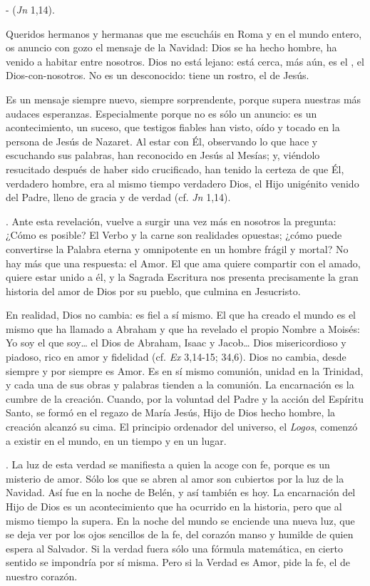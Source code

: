  -  (\emph{Jn} 1,14).

Queridos hermanos y hermanas que me escucháis en Roma y en el mundo entero, os anuncio con gozo el mensaje de la Navidad: Dios se ha hecho hombre, ha venido a habitar entre nosotros. Dios no está lejano: está cerca, más aún, es el , el Dios-con-nosotros. No es un desconocido: tiene un rostro, el de Jesús.

Es un mensaje siempre nuevo, siempre sorprendente, porque supera nuestras más audaces esperanzas. Especialmente porque no es sólo un anuncio: es un acontecimiento, un suceso, que testigos fiables han visto, oído y tocado en la persona de Jesús de Nazaret. Al estar con Él, observando lo que hace y escuchando sus palabras, han reconocido en Jesús al Mesías; y, viéndolo resucitado después de haber sido crucificado, han tenido la certeza de que Él, verdadero hombre, era al mismo tiempo verdadero Dios, el Hijo unigénito venido del Padre, lleno de gracia y de verdad (cf. \emph{Jn} 1,14).

. Ante esta revelación, vuelve a surgir una vez más en nosotros la pregunta: ¿Cómo es posible? El Verbo y la carne son realidades opuestas; ¿cómo puede convertirse la Palabra eterna y omnipotente en un hombre frágil y mortal? No hay más que una respuesta: el Amor. El que ama quiere compartir con el amado, quiere estar unido a él, y la Sagrada Escritura nos presenta precisamente la gran historia del amor de Dios por su pueblo, que culmina en Jesucristo.

En realidad, Dios no cambia: es fiel a sí mismo. El que ha creado el mundo es el mismo que ha llamado a Abraham y que ha revelado el propio Nombre a Moisés: Yo soy el que soy\ldots{} el Dios de Abraham, Isaac y Jacob\ldots{} Dios misericordioso y piadoso, rico en amor y fidelidad (cf. \emph{Ex} 3,14-15; 34,6). Dios no cambia, desde siempre y por siempre es Amor. Es en sí mismo comunión, unidad en la Trinidad, y cada una de sus obras y palabras tienden a la comunión. La encarnación es la cumbre de la creación. Cuando, por la voluntad del Padre y la acción del Espíritu Santo, se formó en el regazo de María Jesús, Hijo de Dios hecho hombre, la creación alcanzó su cima. El principio ordenador del universo, el \emph{Logos}, comenzó a existir en el mundo, en un tiempo y en un lugar.

. La luz de esta verdad se manifiesta a quien la acoge con fe, porque es un misterio de amor. Sólo los que se abren al amor son cubiertos por la luz de la Navidad. Así fue en la noche de Belén, y así también es hoy. La encarnación del Hijo de Dios es un acontecimiento que ha ocurrido en la historia, pero que al mismo tiempo la supera. En la noche del mundo se enciende una nueva luz, que se deja ver por los ojos sencillos de la fe, del corazón manso y humilde de quien espera al Salvador. Si la verdad fuera sólo una fórmula matemática, en cierto sentido se impondría por sí misma. Pero si la Verdad es Amor, pide la fe, el  de nuestro corazón.

